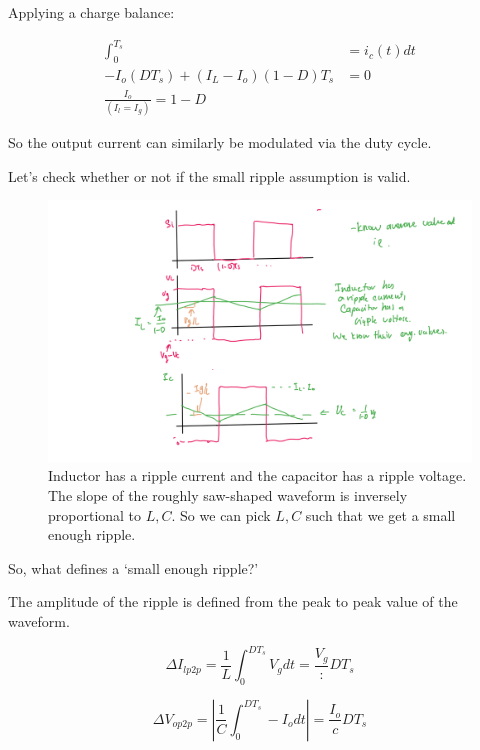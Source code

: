 \documentclass[../notes.tex]{subfiles}
\begin{document}
Applying a charge balance:


\begin{equation}
	\begin{split}
		 \int_{0}^{T_s}  &= i_c(t) dt  \\
										 -I_o (DT_s) + (I_L - I_o) (1-D)T_s &= 0  \\
										 \frac{I_o}{(I_l = I_g)} = 1-D
	\end{split}
\end{equation}

So the output current can similarly be modulated via the duty cycle.


Let's check whether or not if the small ripple assumption is valid.


\begin{figure}[H]
	\centering
	\includegraphics[width=0.8\linewidth]{img/image_2022-09-26-18-45-18.png}
	\caption{Inductor has a ripple current and the capacitor has a ripple voltage. The slope of the roughly saw-shaped waveform is inversely proportional to $ L, C $. So we can pick $ L, C$ such that we get a small enough ripple. }
\end{figure}


So, what defines a `small enough ripple?' 

The amplitude of the ripple is defined from the peak to peak value of the waveform.


\begin{equation}
	\Delta I_{l p2p} = \frac{1}{L} \int_{0}^{DT_s}  V_g dt = \frac{V_g}{:} D T_{s} 
\end{equation}

\begin{equation}
	\Delta V_{o p2p} = |\frac{1}{C} \int_{0}^{DT_s}  -I_o dt| = \frac{I_o}{c} D T_{s}
\end{equation}
\end{document}
